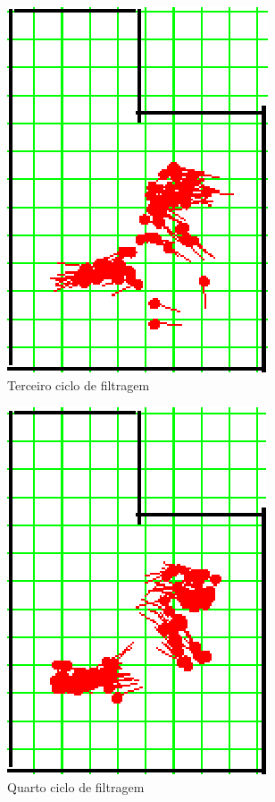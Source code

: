 \begin{figure}[H]
  \centering
  \includegraphics[scale=1]{figuras/cen3_ex2/4.eps}
  \caption[Terceiro Ciclo de Filtragem]{Terceiro ciclo de filtragem}
  \label{img:cen3_ex2_4}
\end{figure}

\begin{figure}[H]
  \centering
  \includegraphics[scale=1]{figuras/cen3_ex2/5.eps}
  \caption[Quarto Ciclo de Filtragem]{Quarto ciclo de filtragem}
  \label{img:cen3_ex2_5}
\end{figure}

